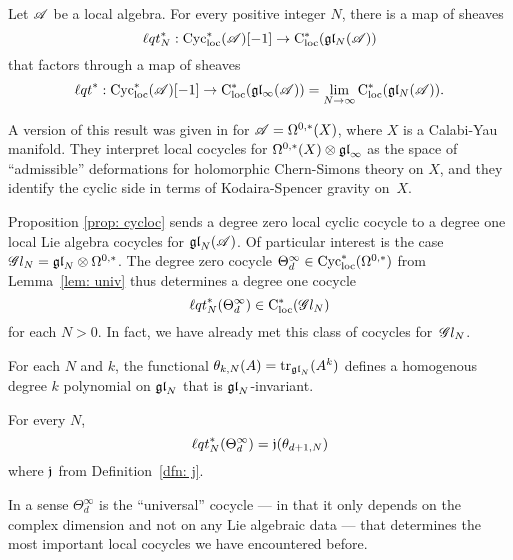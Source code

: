 \begin{prop}
\label{prop: cycloc}
Let $\mathscr A$ be a local algebra.
For every positive integer $N$, there is a map of sheaves
\[
{\ell q t}_N^* : {\rm Cyc}_{\rm loc}^*(\mathscr A)[-1] \to {\rm C}_{\rm loc}^*(\mathfrak{g} \mathfrak{l}_N( \mathscr A)) 
\] 
that factors through a map of sheaves
\[
{\ell q t}^* : {\rm Cyc}_{\rm loc}^*(\mathscr A)[-1] \to {\rm C}_{\rm loc}^*(\mathfrak{g} \mathfrak{l}_\infty( \mathscr A)) = \lim_{N \to \infty} {\rm C}_{\rm loc}^*(\mathfrak{g} \mathfrak{l}_N( \mathscr A))  .
\]
\end{prop}

\begin{rmk}
A version of this result was given in \cite{CL1} for $\mathscr A = \Omega^{0,*}(X)$, 
where $X$ is a Calabi-Yau manifold.
They interpret local cocycles for $\Omega^{0,*}(X) \otimes {\mathfrak{gl}}_\infty$ as the space of ``admissible'' deformations for holomorphic Chern-Simons theory on $X$,
and they identify the cyclic side in terms of Kodaira-Spencer gravity on~$X$.
\end{rmk}

Proposition \ref{prop: cycloc} sends a degree zero local cyclic cocycle to a degree one local Lie algebra cocycles for ${\mathfrak{gl}}_N(\mathscr A)$.
Of particular interest is the case $\mathscr G l_{N} = {\mathfrak{gl}}_N \otimes \Omega^{0,*}$. 
The degree zero cocycle $\Theta_d^\infty \in {\rm Cyc}_{\rm loc}^*(\Omega^{0,*})$ from Lemma~\ref{lem: univ} thus determines a degree one cocycle 
\[
{\ell q t}^*_N(\Theta_d^\infty) \in {\rm C}_{\rm loc}^*(\mathscr G l_N)
\]
for each $N > 0$. 
In fact, we have already met this class of cocycles for~$\mathscr G l_{N}$. 

\begin{dfn}
For each $N$ and $k$, the functional $\theta_{k,N}(A) = {\rm tr}_{{\mathfrak{gl}}_N} (A^k)$ defines a homogenous degree $k$ polynomial on ${\mathfrak{gl}}_N$ that is ${\mathfrak{gl}}_N$-invariant.
\end{dfn}

\begin{lem}
\label{lem:pullbackofthetainfinity}
For every $N$, 
\[
{\ell q t}_N^*(\Theta_d^\infty) = \mathfrak j(\theta_{d+1, N})
\]
where $\mathfrak j$ from Definition~\ref{dfn: j}.
\end{lem}

In a sense $\Theta^\infty_d$ is the ``universal'' cocycle --- in that it only depends on the complex dimension and not on any Lie algebraic data --- that determines the most important local cocycles we have encountered before.


